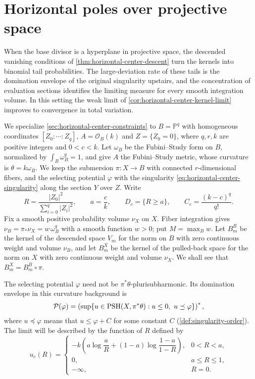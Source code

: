 \section{Horizontal poles over projective space}
\label{sec:horizontal-kernel-asymptotics}

When the base divisor is a hyperplane in projective space, the descended vanishing conditions of \cref{thm:horizontal-center-descent} turn the kernels into binomial tail probabilities. The large-deviation rate of these tails is the domination envelope of the original singularity upstairs, and the concentration of evaluation sections identifies the limiting measure for every smooth integration volume. In this setting the weak limit of \cref{cor:horizontal-center-kernel-limit} improves to convergence in total variation.

We specialize \cref{sec:horizontal-center-constraints} to $B=\mathbb P^q$ with homogeneous coordinates $[Z_0:\cdots:Z_q]$, $A=\mathcal O_B(k)$ and $Z=\{Z_0=0\}$, where $q,r,k$ are positive integers and $0<c<k$. Let $\omega_B$ be the Fubini--Study form on $B$, normalized by $\int_B\omega_B^q=1$, and give $A$ the Fubini--Study metric, whose curvature is $\theta=k\omega_B$. We keep the submersion $\pi\colon X\to B$ with connected $r$-dimensional fibers, and the selecting potential $\varphi$ with the singularity \eqref{eq:horizontal-center-singularity} along the section $Y$ over $Z$. Write
\[
 R=\frac{|Z_0|^2}{\sum_{i=0}^q|Z_i|^2},\qquad
 a=\frac ck,\qquad D_c=\{R\geq a\},\qquad
 C_c=\frac{(k-c)^q}{q!}.
\]
Fix a smooth positive probability volume $\nu_X$ on $X$. Fiber integration gives $\nu_B=\pi_*\nu_X=w\,\omega_B^q$ with a smooth function $w>0$; put $M=\max_Bw$. Let $B_m^B$ be the kernel of the descended space $V_m$ for the norm on $B$ with zero continuous weight and volume $\nu_B$, and let $B_m^X$ be the kernel of the pulled-back space for the norm on $X$ with zero continuous weight and volume $\nu_X$. We shall see that $B_m^X=B_m^B\circ\pi$.

The selecting potential $\varphi$ need not be $\pi^*\theta$-plurisubharmonic. Its domination envelope in this curvature background is
\[
 \mathcal P(\varphi)=
 \left(\sup\{u\in\PSH(X,\pi^*\theta):u\leq0,\ u\preceq\varphi\}\right)^*,
\]
where $u\preceq\varphi$ means that $u\leq\varphi+C$ for some constant $C$ (\cref{def:singularity-order}). The limit will be described by the function of $R$ defined by
\begin{equation}\label{eq:horizontal-projective-envelope}
 u_c(R)=
 \begin{cases}
 -k\left(a\log\dfrac aR+(1-a)\log\dfrac{1-a}{1-R}\right),&0<R<a,\\
 0,&a\leq R\leq1,\\
 -\infty,&R=0.
 \end{cases}
\end{equation}

